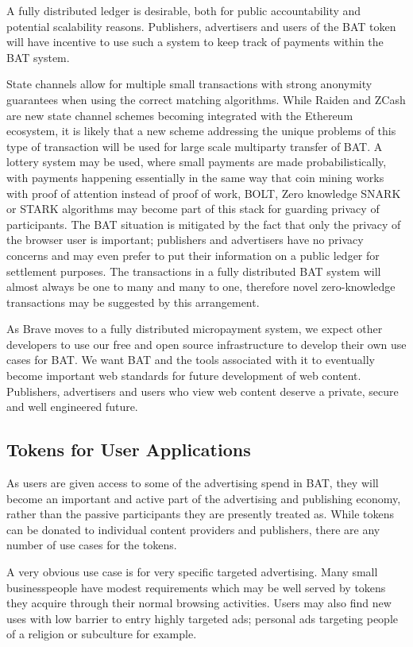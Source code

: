 \documentclass[11pt]{article}
\begin{document}
A fully distributed ledger is desirable, both for public accountability and potential scalability reasons. Publishers, advertisers and users of the BAT token will have incentive to use such a system to keep track of payments within the BAT system. 

State channels allow for multiple small transactions with strong anonymity guarantees when using the correct matching algorithms. While Raiden and ZCash are new state channel schemes becoming integrated with the Ethereum ecosystem, it is likely that a new scheme addressing the unique problems of this type of transaction will be used for large scale multiparty transfer of BAT.
 A lottery system may be used, where small payments are made probabilistically, with payments happening essentially in the same way that coin mining works with proof of attention instead of proof of work\cite{14,15}, BOLT\cite{16}, Zero knowledge SNARK\cite{17} or STARK\cite{18} algorithms may become part of this stack for guarding privacy of participants. The BAT situation is mitigated by the fact that only the privacy of the browser user is important; publishers and advertisers have no privacy concerns and may even prefer to put their information on a public ledger for settlement purposes. The transactions in a fully distributed BAT system will almost always be one to many and many to one, therefore novel zero-knowledge transactions may be suggested by this arrangement.

As Brave moves to a fully distributed micropayment system, we expect other developers to use our free and open source infrastructure to develop their own use cases for BAT. We want BAT and the tools associated with it to eventually become important web standards for future development of web content. Publishers, advertisers and users who view web content deserve a private, secure and well engineered future.
\subsection{Tokens for User Applications}
\label{sec-4-4}

As users are given access to some of the advertising spend in BAT, they will become an important and active part of the advertising and publishing economy, rather than the passive participants they are presently treated as. While tokens can be donated to individual content providers and publishers, there are any number of use cases for the tokens.

A very obvious use case is for very specific targeted advertising. Many small businesspeople have modest requirements which may be well served by tokens they acquire through their normal browsing activities. Users may also find new uses with low barrier to entry highly targeted ads; personal ads targeting people of a religion or subculture for example.
\end{document}
